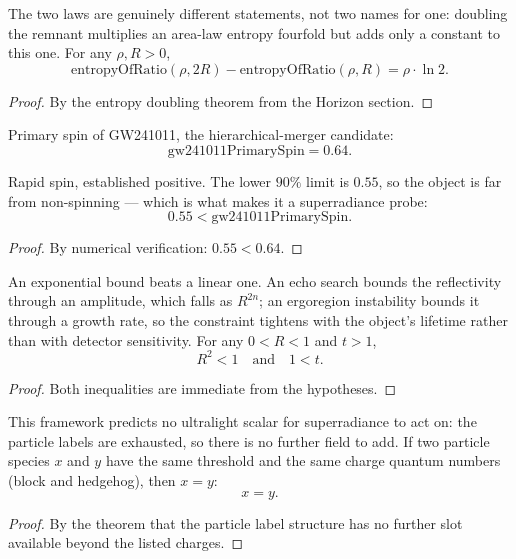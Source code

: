 \begin{theorem}
The two laws are genuinely different statements, not two names for one: doubling the remnant multiplies an area-law entropy fourfold but adds only a constant to this one. For any $\rho, R > 0$,
\[
\text{entropyOfRatio}(\rho, 2R) - \text{entropyOfRatio}(\rho, R) = \rho \cdot \ln 2.
\]
\begin{proof}
By the entropy doubling theorem from the Horizon section.
\end{proof}
\end{theorem}

\begin{definition}
Primary spin of GW241011, the hierarchical-merger candidate:
\[
\text{gw241011PrimarySpin} = 0.64.
\]
\end{definition}

\begin{theorem}
Rapid spin, established positive. The lower $90\%$ limit is $0.55$, so the object is far from non-spinning — which is what makes it a superradiance probe:
\[
0.55 < \text{gw241011PrimarySpin}.
\]
\begin{proof}
By numerical verification: $0.55 < 0.64$.
\end{proof}
\end{theorem}

\begin{theorem}
An exponential bound beats a linear one. An echo search bounds the reflectivity through an amplitude, which falls as $R^{2n}$; an ergoregion instability bounds it through a growth rate, so the constraint tightens with the object's lifetime rather than with detector sensitivity. For any $0 < R < 1$ and $t > 1$,
\[
R^2 < 1 \quad \text{and} \quad 1 < t.
\]
\begin{proof}
Both inequalities are immediate from the hypotheses.
\end{proof}
\end{theorem}

\begin{theorem}
This framework predicts no ultralight scalar for superradiance to act on: the particle labels are exhausted, so there is no further field to add. If two particle species $x$ and $y$ have the same threshold and the same charge quantum numbers (block and hedgehog), then $x = y$:
\[
x = y.
\]
\begin{proof}
By the theorem that the particle label structure has no further slot available beyond the listed charges.
\end{proof}
\end{theorem}

